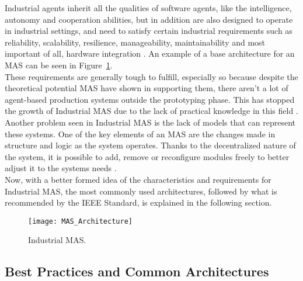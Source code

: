 Industrial agents inherit all the qualities of software agents, like the intelligence, autonomy and cooperation abilities, but in addition are also designed to operate in industrial settings, and need to satisfy certain industrial requirements such as reliability, scalability, resilience, manageability, maintainability and most important of all, hardware integration \cite{Leitao2021}. An example of a base architecture for an \acrshort{MAS} can be seen in Figure~\ref{fig:MAS_Architecture}. \\



These requirements are generally tough to fulfill, especially so because despite the theoretical potential \acrshort{MAS} have shown in supporting them, there aren't a lot of agent-based production systems outside the prototyping phase. This has stopped the growth of Industrial \acrshort{MAS} due to the lack of practical knowledge in this field \cite{Karnouskos2019}. Another problem seen in Industrial \acrshort{MAS} is the lack of models that can represent these systems. One of the key elements of an \acrshort{MAS} are the changes made in structure and logic as the system operates. Thanks to the decentralized nature of the system, it is possible to add, remove or reconfigure modules freely to better adjust it to the systems needs \cite{Karnouskos2019}.\\

Now, with a better formed idea of the characteristics and requirements for Industrial \acrshort{MAS}, the most commonly used architectures, followed by what is recommended by the IEEE Standard, is explained in the following section.

\begin{figure}[h!]
	\centering
	\texttt{[image: MAS\_Architecture]}
	\caption{Industrial \acrlong{MAS}.}
	\label{fig:MAS_Architecture}
\end{figure}

\subsection{Best Practices and Common Architectures}
\label{subsec:best_practices_and_common_architectures}

